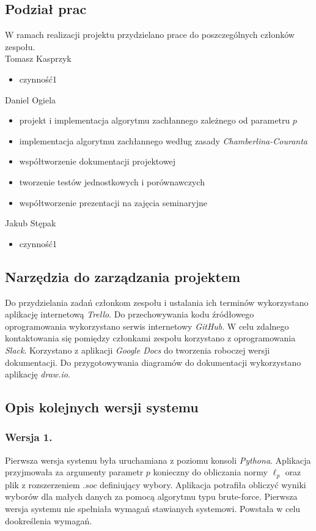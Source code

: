 \documentclass[polish,11pt]{aghthesis}
\begin{document}
\subsection{Podział prac}
W ramach realizacji projektu przydzielano prace do poszczególnych członków zespołu.
\vspace{\baselineskip} \\
Tomasz Kasprzyk
\begin{itemize}
\item czynność1
\end{itemize}
Daniel Ogiela
\begin{itemize}
\item projekt i implementacja algorytmu zachłannego zależnego od parametru $p$
\item implementacja algorytmu zachłannego według zasady \textit{Chamberlina-Couranta}
\item współtworzenie dokumentacji projektowej
\item tworzenie testów jednostkowych i porównawczych
\item współtworzenie prezentacji na zajęcia seminaryjne 
\end{itemize}
Jakub Stępak
\begin{itemize}
\item czynność1
\end{itemize}

\subsection{Narzędzia do zarządzania projektem}
Do przydzielania zadań członkom zespołu i ustalania ich terminów wykorzystano aplikację
internetową \textit{Trello}. Do przechowywania kodu źródłowego oprogramowania wykorzystano
serwis internetowy \textit{GitHub}. W celu zdalnego kontaktowania się pomiędzy członkami zespołu korzystano z oprogramowania \textit{Slack}. Korzystano z aplikacji \textit{Google Docs }do tworzenia roboczej wersji dokumentacji. Do przygotowywania diagramów do dokumentacji wykorzystano aplikację \textit{draw.io}.

\subsection{Opis kolejnych wersji systemu}
\subsubsection{Wersja 1.}
Pierwsza wersja systemu była uruchamiana z poziomu konsoli \textit{Pythona}. Aplikacja
przyjmowała za argumenty parametr $p$ konieczny do obliczania normy $\ell_p$ oraz plik z
rozszerzeniem $.soc$ definiujący wybory. Aplikacja potrafiła obliczyć wyniki wyborów dla
małych danych za pomocą algorytmu typu brute-force. Pierwsza wersja systemu nie spełniała wymagań stawianych systemowi. Powstała w celu dookreślenia wymagań.
\end{document}
